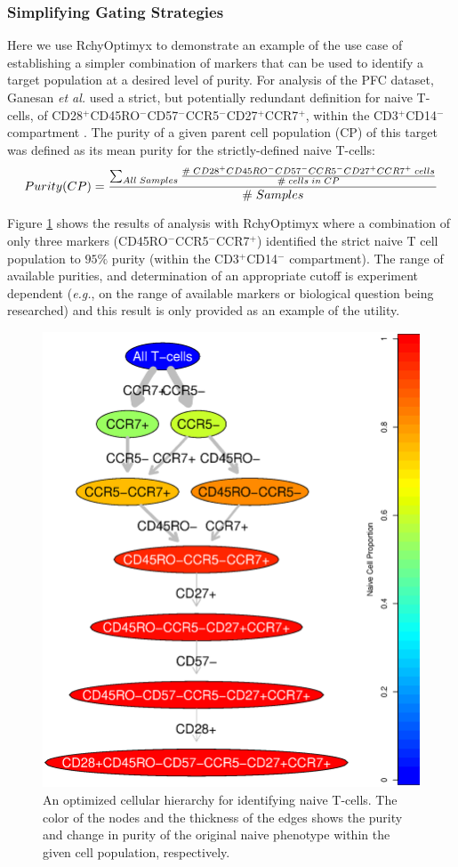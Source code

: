 \subsubsection{Simplifying Gating Strategies}

Here we use RchyOptimyx to demonstrate  an example of the use case of establishing  a simpler combination of markers that can be used to  identify a target population at a desired level of purity. 
For analysis of the PFC dataset, Ganesan \emph{et al.} used a strict, but potentially redundant definition for naive T-cells, of CD28$^+$CD45RO$^-$CD57$^-$CCR5$^-$CD27$^+$CCR7$^+$, within the CD3$^+$CD14$^-$ compartment \cite{Ganesan2010Immunologic}.
The purity of a given parent cell population (CP) of  this target was defined as its mean purity for the strictly-defined naive T-cells:
\begin{equation}\small
  Purity(CP)=\frac{\sum_{All \; Samples}\frac{\# \; CD28^+ CD45RO^- CD57^- CCR5^- CD27^+ CCR7^+ \; cells}{\# \; cells \; in \; CP}}{\# \; Samples}
\end{equation}

Figure \ref{r1:NaiveOverlap} shows the results of analysis with RchyOptimyx where a combination of only three markers (CD45RO$^-$CCR5$^-$CCR7$^+$) identified the strict naive T cell population to $95\%$ purity (within the CD3$^+$CD14$^-$ compartment).
The range of available purities, and determination of an appropriate cutoff is experiment dependent (\emph{e.g.}, on the range of available markers or biological question being researched) and this result is only provided as an example of the utility. 

\begin{figure}[ht]
  \begin{center}
    \includegraphics[width=.7\textwidth]{figs/rchy/NaiveOverlap}
  \end{center}
  \caption{An optimized cellular hierarchy for identifying naive T-cells. The color of the nodes and the thickness of the edges shows the purity and change in purity of the original naive phenotype within the given cell population, respectively.
  }
  \label{r1:NaiveOverlap}
\end{figure}


